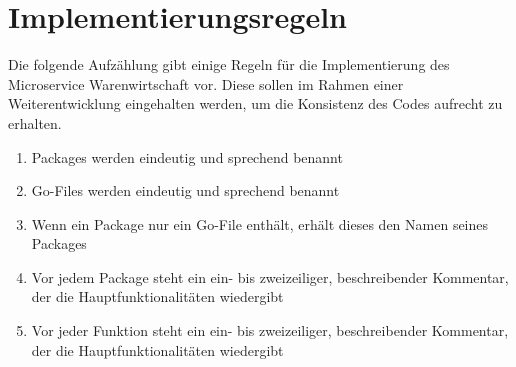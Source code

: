 \section{Implementierungsregeln}
\label{sec: Implementierungsregeln}
Die folgende Aufzählung gibt einige Regeln für die Implementierung des Microservice Warenwirtschaft vor. Diese sollen im Rahmen einer Weiterentwicklung eingehalten werden, um die Konsistenz des Codes aufrecht zu erhalten. 

\begin{enumerate}
	\item Packages werden eindeutig und sprechend benannt
	\item Go-Files werden eindeutig und sprechend benannt
	\item Wenn ein Package nur ein Go-File enthält, erhält dieses den Namen seines Packages
	\item Vor jedem Package steht ein ein- bis zweizeiliger, beschreibender Kommentar, der die Hauptfunktionalitäten wiedergibt
	\item Vor jeder Funktion steht ein ein- bis zweizeiliger, beschreibender Kommentar, der die Hauptfunktionalitäten wiedergibt
\end{enumerate}

